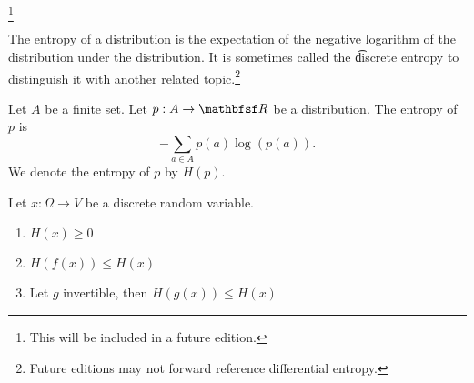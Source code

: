 
\footnote{This will be included in a future edition.}


The entropy of a distribution
is the
expectation of the negative
logarithm of the distribution
under the distribution.
It is sometimes called the \t{discrete entropy} to distinguish it with another related topic.\footnote{Future editions may not forward reference differential entropy.}



Let $A$ be a finite set.
Let $p:A \to \R$ be a distribution.
The entropy of $p$ is
\[
  -\sum_{a \in A} p(a) \log(p(a)).
\]
We denote the entropy of $p$ by
$H(p)$.


Let $x: \Omega \to V$ be a discrete random variable.

\begin{enumerate}
\item $H(x) \geq 0$
\item $H(f(x)) \leq H(x)$
\item Let $g$ invertible, then $H(g(x)) \leq H(x)$
\end{enumerate}


\blankpage
